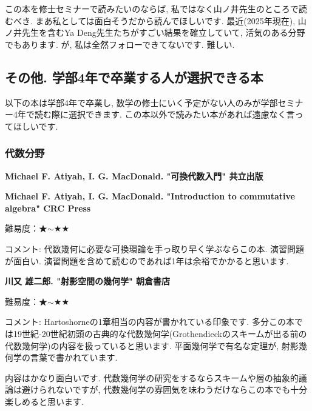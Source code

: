 この本を修士セミナーで読みたいのならば, 私ではなく山ノ井先生のところで読むべき. まあ私としては面白そうだから読んでほしいです. 最近(2025年現在), 山ノ井先生を含むYa Deng先生たちがすごい結果を確立していて, 活気のある分野でもあります. が, 私は全然フォローできてないです. 難しい.
\vspace{8pt}


\subsection{その他. 学部4年で卒業する人が選択できる本}
\label{subsec-seminar-23}

以下の本は学部4年で卒業し, 数学の修士にいく予定がない人のみが学部セミナー4年で読む際に選択できます. 
この本以外で読みたい本があれば遠慮なく言ってほしいです. 

\subsubsection{代数分野}

\textbf{Michael F. Atiyah, I. G. MacDonald. "可換代数入門" 共立出版}  　\vspace{-6pt} 

\textbf{Michael F. Atiyah, I. G. MacDonald. "Introduction to commutative algebra" CRC Press}  　\vspace{-6pt} 

難易度：★$\sim$★★ 　\vspace{-6pt} 

コメント: 代数幾何に必要な可換環論を手っ取り早く学ぶならこの本. 演習問題が面白い. 
演習問題を含めて読むのであれば1年は余裕でかかると思います. 

\vspace{8pt}

\textbf{川又 雄二郎. "射影空間の幾何学" 朝倉書店}  　\vspace{-6pt} 

難易度：★$\sim$★★ 　\vspace{-6pt} 

コメント:  Hartoshorneの1章相当の内容が書かれている印象です. 多分この本では19世紀-20世紀初頭の古典的な代数幾何学(Grothendieckのスキームが出る前の代数幾何学)の内容を扱っていると思います.
平面幾何学で有名な定理が, 射影幾何学の言葉で書かれています. 

内容はかなり面白いです. 代数幾何学の研究をするならスキームや層の抽象的議論は避けられないですが, 代数幾何学の雰囲気を味わうだけならこの本でも十分楽しめると思います. 
\vspace{8pt}

